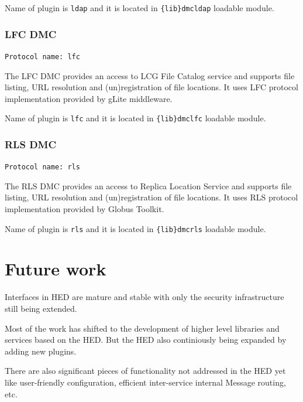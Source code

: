 \documentclass{book}
\begin{document}
Name of plugin is \texttt{ldap} and it is located in \texttt{\{lib\}dmcldap} loadable module.


\subsection{LFC DMC}

\texttt{Protocol name: lfc}

The LFC DMC provides an access to LCG File Catalog service and supports file listing, URL resolution and (un)registration of file locations. It uses LFC protocol implementation provided by gLite middleware.

Name of plugin is \texttt{lfc} and it is located in \texttt{\{lib\}dmclfc} loadable module.


\subsection{RLS DMC}

\texttt{Protocol name: rls}

The RLS DMC provides an access to Replica Location Service and supports file listing, URL resolution and (un)registration of file locations. It uses RLS protocol implementation provided by Globus Toolkit.

Name of plugin is \texttt{rls} and it is located in \texttt{\{lib\}dmcrls} loadable module.


\chapter{Future work}

Interfaces in HED are mature and stable with only the security infrastructure still being extended.

Most of the work has shifted to the development of higher level libraries and services based on the HED. But the HED also continiously being expanded by adding new plugins.

There are also significant pieces of functionality not addressed in the HED yet like user-friendly configuration, efficient inter-service internal Message routing, etc.



\end{document}
